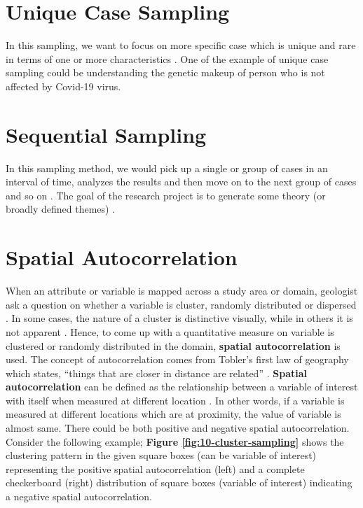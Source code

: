\documentclass[
]{book}
\begin{document}
\hypertarget{unique-case-sampling}{%
\section{Unique Case Sampling}\label{unique-case-sampling}}

In this sampling, we want to focus on more specific case which is unique and rare in terms of one or more characteristics \citep{teddlie_mixed_2007}. One of the example of unique case sampling could be understanding the genetic makeup of person who is not affected by Covid-19 virus.

\hypertarget{sequential-sampling}{%
\section{Sequential Sampling}\label{sequential-sampling}}

In this sampling method, we would pick up a single or group of cases in an interval of time, analyzes the results and then move on to the next group of cases and so on \citep{teddlie_mixed_2007}. The goal of the research project is to generate some theory (or broadly defined themes) \citep{teddlie_mixed_2007}.

\hypertarget{spatial-autocorrelation-1}{%
\section{Spatial Autocorrelation}\label{spatial-autocorrelation-1}}

When an attribute or variable is mapped across a study area or domain, geologist ask a question on whether a variable is cluster, randomly distributed or dispersed \citep{carr_general_1993}. In some cases, the nature of a cluster is distinctive visually, while in others it is not apparent \citep{carr_general_1993}. Hence, to come up with a quantitative measure on variable is clustered or randomly distributed in the domain, \textbf{spatial autocorrelation} is used. The concept of autocorrelation comes from Tobler's first law of geography which states, ``things that are closer in distance are related'' \citep{tobler_computer_1970}. \textbf{Spatial autocorrelation} can be defined as the relationship between a variable of interest with itself when measured at different location \citep{cliff_ad_and_ord_spatial_1973}. In other words, if a variable is measured at different locations which are at proximity, the value of variable is almost same. There could be both positive and negative spatial autocorrelation. Consider the following example; \textbf{Figure \ref{fig:10-cluster-sampling}} shows the clustering pattern in the given square boxes (can be variable of interest) representing the positive spatial autocorrelation (left) and a complete checkerboard (right) distribution of square boxes (variable of interest) indicating a negative spatial autocorrelation.
\end{document}
